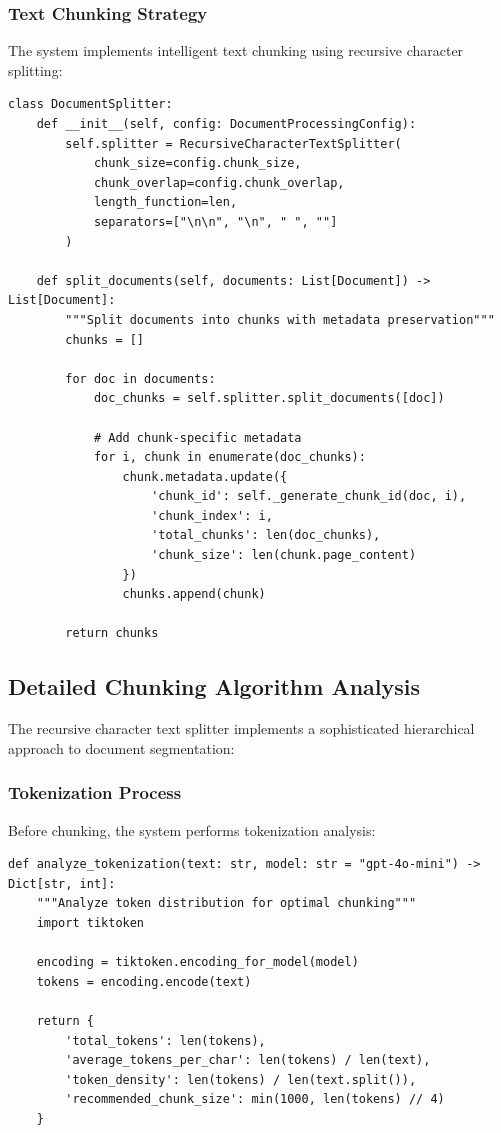 \documentclass[12pt,a4paper]{article}
\begin{document}
\subsubsection{Text Chunking Strategy}

The system implements intelligent text chunking using recursive character splitting:

\begin{lstlisting}[caption=Text Splitter Implementation]
class DocumentSplitter:
    def __init__(self, config: DocumentProcessingConfig):
        self.splitter = RecursiveCharacterTextSplitter(
            chunk_size=config.chunk_size,
            chunk_overlap=config.chunk_overlap,
            length_function=len,
            separators=["\n\n", "\n", " ", ""]
        )
    
    def split_documents(self, documents: List[Document]) -> List[Document]:
        """Split documents into chunks with metadata preservation"""
        chunks = []
        
        for doc in documents:
            doc_chunks = self.splitter.split_documents([doc])
            
            # Add chunk-specific metadata
            for i, chunk in enumerate(doc_chunks):
                chunk.metadata.update({
                    'chunk_id': self._generate_chunk_id(doc, i),
                    'chunk_index': i,
                    'total_chunks': len(doc_chunks),
                    'chunk_size': len(chunk.page_content)
                })
                chunks.append(chunk)
        
        return chunks
\end{lstlisting}

\subsection{Detailed Chunking Algorithm Analysis}

The recursive character text splitter implements a sophisticated hierarchical approach to document segmentation:

\subsubsection{Tokenization Process}

Before chunking, the system performs tokenization analysis:

\begin{lstlisting}[caption=Tokenization Analysis]
def analyze_tokenization(text: str, model: str = "gpt-4o-mini") -> Dict[str, int]:
    """Analyze token distribution for optimal chunking"""
    import tiktoken
    
    encoding = tiktoken.encoding_for_model(model)
    tokens = encoding.encode(text)
    
    return {
        'total_tokens': len(tokens),
        'average_tokens_per_char': len(tokens) / len(text),
        'token_density': len(tokens) / len(text.split()),
        'recommended_chunk_size': min(1000, len(tokens) // 4)
    }
\end{lstlisting}
\end{document}
